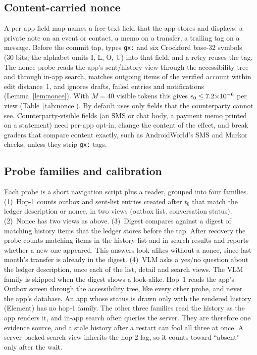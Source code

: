 \subsection{Content-carried nonce}
\label{sec:design-nonce}
A per-app field map names a free-text field that the app stores and displays: a private note on an event or contact, a memo on a transfer, a trailing tag on a message.
Before the commit tap, \sys types \texttt{gx:} and six Crockford base-32 symbols (30 bits; the alphabet omits I, L, O, U) into that field, and a retry reuses the tag.
The nonce probe reads the app's sent/history view through the accessibility tree and through in-app search, matches outgoing items of the verified account within edit distance~1,
and ignores drafts, failed entries and notifications (Lemma~\ref{lem:nonce}). With $M{=}40$ visible tokens this gives $\epsilon_0\le7.2{\times}10^{-6}$ per view (Table~\ref{tab:nonce}).
By default \sys uses only fields that the counterparty cannot see. Counterparty-visible fields (an SMS or chat body, a payment memo printed on a statement) need per-app opt-in, change
the content of the effect, and break graders that compare content exactly, such as AndroidWorld's SMS and Markor checks, unless they strip \texttt{gx:} tags.

\subsection{Probe families and calibration}
\label{sec:design-probes}
Each probe is a short navigation script plus a reader, grouped into four families.
(1)~Hop-1 counts outbox and sent-list entries created after $t_0$ that match the ledger description or nonce, in two views (outbox list, conversation status).
(2)~Nonce has two views as above.
(3)~Digest compares against a digest of matching history items that the ledger stores before the tap. After recovery the probe counts matching items in the history list and in
search results and reports whether a new one appeared. This answers look-alikes without a nonce, since last month's transfer is already in the digest.
(4)~VLM asks a yes/no question about the ledger description, once each of the list, detail and search views. The VLM family is skipped when the digest shows a look-alike.
Hop~1 reads the app's Outbox screen through the accessibility tree, like every other probe, and never the app's database. An app whose status is drawn only with the
rendered history (Element) has no hop-1 family. The other three families read the history as the app renders it, and in-app search often queries the server. They are therefore one
evidence source, and a stale history after a restart can fool all three at once. A server-backed search view inherits the hop-2 lag, so it counts toward ``absent'' only after the wait.

